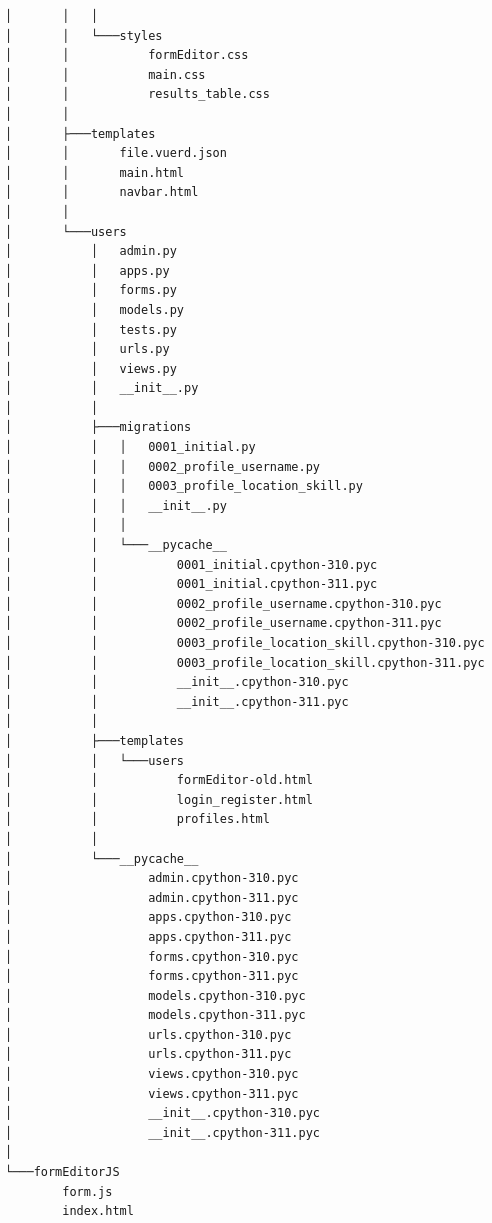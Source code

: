 \documentclass[letterpaper, 12 pt, conference]{ieeeconf}
\begin{document}
\begin{lstlisting}
│       │   │
│       │   └───styles
│       │           formEditor.css
│       │           main.css
│       │           results_table.css
│       │
│       ├───templates
│       │       file.vuerd.json
│       │       main.html
│       │       navbar.html
│       │
│       └───users
│           │   admin.py
│           │   apps.py
│           │   forms.py
│           │   models.py
│           │   tests.py
│           │   urls.py
│           │   views.py
│           │   __init__.py
│           │
│           ├───migrations
│           │   │   0001_initial.py
│           │   │   0002_profile_username.py
│           │   │   0003_profile_location_skill.py
│           │   │   __init__.py
│           │   │
│           │   └───__pycache__
│           │           0001_initial.cpython-310.pyc
│           │           0001_initial.cpython-311.pyc
│           │           0002_profile_username.cpython-310.pyc
│           │           0002_profile_username.cpython-311.pyc
│           │           0003_profile_location_skill.cpython-310.pyc
│           │           0003_profile_location_skill.cpython-311.pyc
│           │           __init__.cpython-310.pyc
│           │           __init__.cpython-311.pyc
│           │
│           ├───templates
│           │   └───users
│           │           formEditor-old.html
│           │           login_register.html
│           │           profiles.html
│           │
│           └───__pycache__
│                   admin.cpython-310.pyc
│                   admin.cpython-311.pyc
│                   apps.cpython-310.pyc
│                   apps.cpython-311.pyc
│                   forms.cpython-310.pyc
│                   forms.cpython-311.pyc
│                   models.cpython-310.pyc
│                   models.cpython-311.pyc
│                   urls.cpython-310.pyc
│                   urls.cpython-311.pyc
│                   views.cpython-310.pyc
│                   views.cpython-311.pyc
│                   __init__.cpython-310.pyc
│                   __init__.cpython-311.pyc
│
└───formEditorJS
        form.js
        index.html
\end{lstlisting}

\doublespacing
\end{document}
